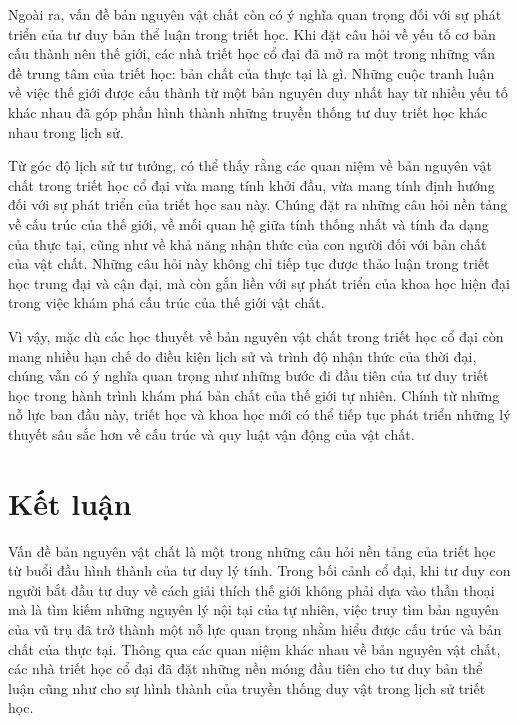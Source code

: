 \documentclass[14pt,a4paper]{extarticle}
\begin{document}
Ngoài ra, vấn đề bản nguyên vật chất còn có ý nghĩa quan trọng đối với sự phát triển của tư duy bản thể luận trong triết học. Khi đặt câu hỏi về yếu tố cơ bản cấu thành nên thế giới, các nhà triết học cổ đại đã mở ra một trong những vấn đề trung tâm của triết học: bản chất của thực tại là gì. Những cuộc tranh luận về việc thế giới được cấu thành từ một bản nguyên duy nhất hay từ nhiều yếu tố khác nhau đã góp phần hình thành những truyền thống tư duy triết học khác nhau trong lịch sử.

Từ góc độ lịch sử tư tưởng, có thể thấy rằng các quan niệm về bản nguyên vật chất trong triết học cổ đại vừa mang tính khởi đầu, vừa mang tính định hướng đối với sự phát triển của triết học sau này. Chúng đặt ra những câu hỏi nền tảng về cấu trúc của thế giới, về mối quan hệ giữa tính thống nhất và tính đa dạng của thực tại, cũng như về khả năng nhận thức của con người đối với bản chất của vật chất. Những câu hỏi này không chỉ tiếp tục được thảo luận trong triết học trung đại và cận đại, mà còn gắn liền với sự phát triển của khoa học hiện đại trong việc khám phá cấu trúc của thế giới vật chất.

Vì vậy, mặc dù các học thuyết về bản nguyên vật chất trong triết học cổ đại còn mang nhiều hạn chế do điều kiện lịch sử và trình độ nhận thức của thời đại, chúng vẫn có ý nghĩa quan trọng như những bước đi đầu tiên của tư duy triết học trong hành trình khám phá bản chất của thế giới tự nhiên. Chính từ những nỗ lực ban đầu này, triết học và khoa học mới có thể tiếp tục phát triển những lý thuyết sâu sắc hơn về cấu trúc và quy luật vận động của vật chất.

\section*{Kết luận}

Vấn đề bản nguyên vật chất là một trong những câu hỏi nền tảng của triết học từ buổi đầu hình thành của tư duy lý tính. Trong bối cảnh cổ đại, khi tư duy con người bắt đầu tư duy về cách giải thích thế giới không phải dựa vào thần thoại mà là tìm kiếm những nguyên lý nội tại của tự nhiên, việc truy tìm bản nguyên của vũ trụ đã trở thành một nỗ lực quan trọng nhằm hiểu được cấu trúc và bản chất của thực tại. Thông qua các quan niệm khác nhau về bản nguyên vật chất, các nhà triết học cổ đại đã đặt những nền móng đầu tiên cho tư duy bản thể luận cũng như cho sự hình thành của truyền thống duy vật trong lịch sử triết học.
\end{document}

